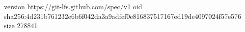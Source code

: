version https://git-lfs.github.com/spec/v1
oid sha256:4d231b761232e6b6f042da3a9adfef0e816837517167ed19de4097024f57e576
size 278841
